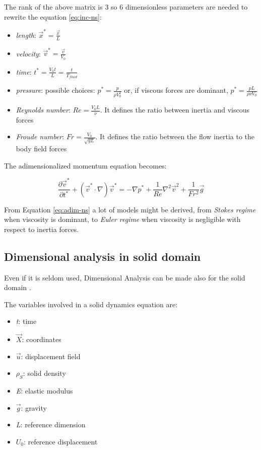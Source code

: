 The rank of the above matrix is 3 so 6 dimensionless parameters are needed to rewrite the equation \ref{eq:inc-ns}:

\begin{itemize}
	\item \textit{length}: $\vec{x}^* = \frac{\vec{x}}{L}$
	\item \textit{velocity}: $\vec{v}^* = \frac{\vec{v}}{V_0}$
	\item \textit{time}: $t^* = \frac{V_0 t}{L} = \frac{t}{T_{fluid}}$
	\item \textit{pressure}: possible choices: $p^* = \frac{p}{\rho V_0^2}$ or, if viscous forces are dominant, $p^*= \frac{p L}{\rho \nu V_0}$
	\item \textit{Reynolds number}: $Re=\frac{V_0 L}{\nu}$. It defines the ratio between inertia and viscous forces
	\item \textit{Froude number}: $Fr = \frac{V_0}{\sqrt{g L}}$. It defines the ratio between the flow inertia to the body field forces
\end{itemize} 


The adimensionalized momentum equation becomes:

\begin{equation}
	\frac{\partial \vec{v}^*}{\partial t^*} + \left( \vec{v}^* \cdot \nabla \right) \vec{v}^* = -\nabla p^* +\frac{1}{Re} \nabla^2 \vec{v}^2 + \frac{1}{Fr^2}\vec{g}
	\label{eq:adim-ns}
\end{equation}

From Equation \ref{eq:adim-ns} a lot of models might be derived, from \textit{Stokes regime} when viscosity is dominant, to \textit{Euler regime} when viscosity is negligible with respect to inertia forces.


\subsection{Dimensional analysis in solid domain}

Even if it is seldom used, Dimensional Analysis can be made also for the solid domain \cite{longo2011analisi}.

The variables involved in a solid dynamics equation are:

\begin{itemize}
	\item \textit{t}: time
	\item $\vec{X}$: coordinates
	\item $\vec{u}$: displacement field
	\item $\rho_S$: solid density
	\item \textit{E}: elastic modulus
	\item $\vec{g}$: gravity
	\item \textit{L}: reference dimension
	\item $U_0$: reference displacement
\end{itemize}

